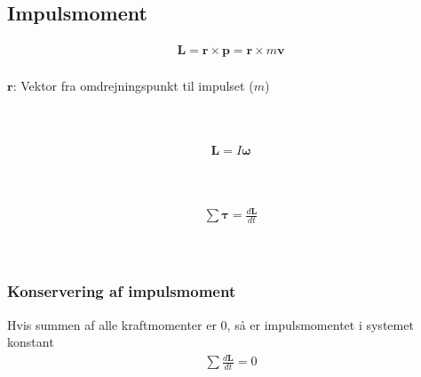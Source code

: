 \subsection{Impulsmoment}
	\begin{align}
		\mathbf{L}=\mathbf{r}\times\mathbf{p}=\mathbf{r}\times m\mathbf{v}
	\end{align}
	\Impulsmom\\
	$\mathbf{r}$: Vektor fra omdrejningspunkt til impulset ($m$)\\
	\Impuls\\
	\masse\\
	\Vel

	\begin{align}
		\mathbf{L}=I\boldsymbol{\omega}
	\end{align}
	\Impulsmom\\
	\inertimom\\
	\vinkelhast

	\begin{align}
		\sum\boldsymbol{\tau}=\frac{d\mathbf{L}}{dt}
	\end{align}
	\Kraftmom\\
	\Impulsmom\\
	\tid

	\subsubsection{Konservering af impulsmoment}
		Hvis summen af alle kraftmomenter er 0, så er impulsmomentet i systemet konstant
		\begin{align}
			\sum\frac{d\mathbf{L}}{dt}=0
		\end{align}
		\Impulsmom


